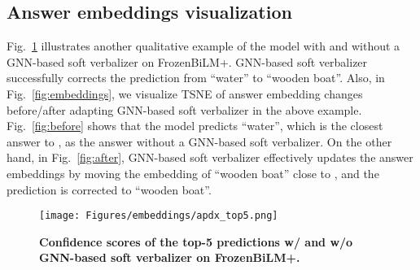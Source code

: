 \documentclass[10pt,twocolumn,letterpaper]{article}
\begin{document}
\subsection{Answer embeddings visualization}
Fig.~\ref{fig:apdx_top5} illustrates another qualitative example of the model with and without a GNN-based soft verbalizer on FrozenBiLM+.
GNN-based soft verbalizer successfully corrects the prediction from ``water'' to ``wooden boat''.
Also, in Fig.~\ref{fig:embeddings}, we visualize TSNE of answer embedding changes before/after adapting GNN-based soft verbalizer in the above example.
Fig.~\ref{fig:before} shows that the model predicts ``water'', which is the closest answer to , as the answer without a GNN-based soft verbalizer.
On the other hand, in Fig.~\ref{fig:after}, GNN-based soft verbalizer effectively updates the answer embeddings by moving the embedding of ``wooden boat'' close to , and the prediction is corrected to ``wooden boat''. \begin{figure}[t] 
    \centering
        \texttt{[image: Figures/embeddings/apdx\_top5.png]}
        \caption{\textbf{Confidence scores of the top-5 predictions w/ and w/o GNN-based soft verbalizer on FrozenBiLM+.}}
        \label{fig:apdx_top5}
\end{figure}
\end{document}
